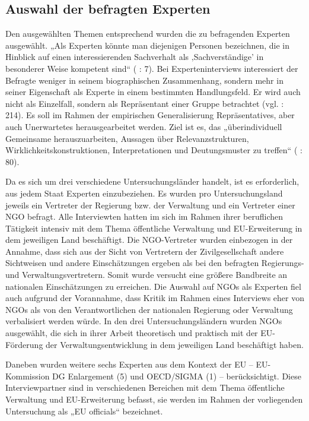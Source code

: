 \subsection{Auswahl der befragten Experten}
Den ausgewählten Themen entsprechend wurden die zu befragenden Experten ausgewählt. „Als Experten könnte man diejenigen Personen bezeichnen, die in Hinblick auf einen interessierenden Sachverhalt als ‚Sachverständige’ in besonderer Weise kompetent sind“ (\cite{deeke} : 7). Bei Experteninterviews interessiert der Befragte weniger in seinem biographischen Zusammenhang, sondern mehr in seiner Eigenschaft als Experte in einem bestimmten Handlungsfeld. Er wird auch nicht als Einzelfall, sondern als Repräsentant einer Gruppe betrachtet (vgl. \cite{flick10} : 214). Es soll im Rahmen der empirischen Generalisierung Repräsentatives, aber auch Unerwartetes herausgearbeitet werden. Ziel ist es, das „überindividuell Gemeinsame herauszuarbeiten, Aussagen über Relevanzstrukturen, Wirklichkeitskonstruktionen, Interpretationen und Deutungsmuster zu treffen“ (\cite{meuser} : 80).\par
Da es sich um drei verschiedene Untersuchungsländer handelt, ist es erforderlich, aus jedem Staat Experten einzubeziehen. Es wurden pro Untersuchungsland jeweils ein Vertreter der Regierung bzw. der Verwaltung und ein Vertreter einer NGO befragt. Alle Interviewten hatten im sich im Rahmen ihrer beruflichen Tätigkeit intensiv mit dem Thema öffentliche Verwaltung und EU-Erweiterung in dem jeweiligen Land beschäftigt. Die NGO-Vertreter wurden einbezogen in der Annahme, dass sich aus der Sicht von Vertretern der Zivilgesellschaft andere Sichtweisen und andere Einschätzungen ergeben als bei den befragten Regierungs- und Verwaltungsvertretern. Somit wurde versucht eine größere Bandbreite an nationalen Einschätzungen zu erreichen. Die Auswahl auf NGOs als Experten fiel auch aufgrund der Vorannahme, dass Kritik im Rahmen eines Interviews eher von NGOs als von den Verantwortlichen der nationalen Regierung oder Verwaltung verbalisiert werden würde. In den drei Untersuchungsländern wurden NGOs ausgewählt, die sich in ihrer Arbeit theoretisch und praktisch mit der EU-Förderung der Verwaltungsentwicklung in dem jeweiligen Land beschäftigt haben.\par
Daneben wurden weitere sechs Experten aus dem Kontext der EU – EU-Kommission DG Enlargement (5) und OECD/SIGMA (1) – berücksichtigt. Diese Interviewpartner sind in verschiedenen Bereichen mit dem Thema öffentliche Verwaltung und EU-Erweiterung befasst, sie werden im Rahmen der vorliegenden Untersuchung als „EU officials“ bezeichnet.\par
